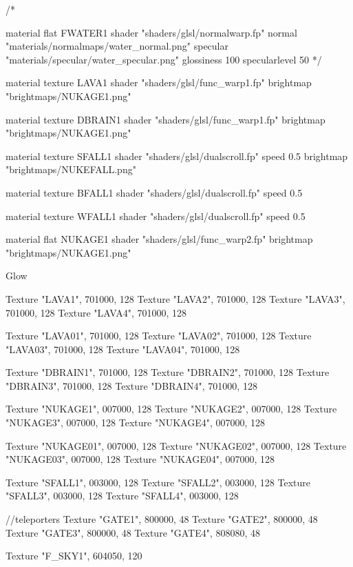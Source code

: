 /*

material flat FWATER1 {
	shader "shaders/glsl/normalwarp.fp"
	normal "materials/normalmaps/water_normal.png"
	specular "materials/specular/water_specular.png"
	glossiness 100
	specularlevel 50
}*/

material texture LAVA1 {
	shader "shaders/glsl/func_warp1.fp"
	brightmap "brightmaps/NUKAGE1.png"
}

material texture DBRAIN1 {
	shader "shaders/glsl/func_warp1.fp"
	brightmap "brightmaps/NUKAGE1.png"
}

material texture SFALL1 {
	shader "shaders/glsl/dualscroll.fp"
	speed 0.5
	brightmap "brightmaps/NUKEFALL.png"
}

material texture BFALL1 {
	shader "shaders/glsl/dualscroll.fp"
	speed 0.5
}

material texture WFALL1 {
	shader "shaders/glsl/dualscroll.fp"
	speed 0.5
}


material flat NUKAGE1 {
	shader "shaders/glsl/func_warp2.fp"
	brightmap "brightmaps/NUKAGE1.png"
}

Glow {
	Texture "LAVA1", 701000, 128
	Texture "LAVA2", 701000, 128
	Texture "LAVA3", 701000, 128
	Texture "LAVA4", 701000, 128
	
	Texture "LAVA01", 701000, 128
	Texture "LAVA02", 701000, 128
	Texture "LAVA03", 701000, 128
	Texture "LAVA04", 701000, 128
	
	Texture "DBRAIN1", 701000, 128
	Texture "DBRAIN2", 701000, 128
	Texture "DBRAIN3", 701000, 128
	Texture "DBRAIN4", 701000, 128
	
	Texture "NUKAGE1", 007000, 128
	Texture "NUKAGE2", 007000, 128
	Texture "NUKAGE3", 007000, 128
	Texture "NUKAGE4", 007000, 128
	
	Texture "NUKAGE01", 007000, 128
	Texture "NUKAGE02", 007000, 128
	Texture "NUKAGE03", 007000, 128
	Texture "NUKAGE04", 007000, 128
	
	Texture "SFALL1", 003000, 128
	Texture "SFALL2", 003000, 128
	Texture "SFALL3", 003000, 128
	Texture "SFALL4", 003000, 128
	
	//teleporters
	Texture "GATE1", 800000, 48
	Texture "GATE2", 800000, 48
	Texture "GATE3", 800000, 48
	Texture "GATE4", 808080, 48
	
	Texture "F_SKY1", 604050, 120
}
